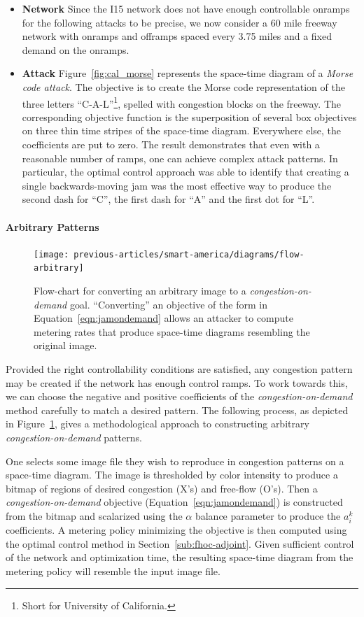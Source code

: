 \begin{itemize}
	\item \textbf{Network}
	Since the I15 network does not have enough controllable onramps for the following attacks to be precise, we now consider a 60 mile freeway network with onramps and offramps spaced every 3.75  miles and a fixed demand on the onramps.
	\item \textbf{Attack}
	Figure~\ref{fig:cal_morse} represents the space-time diagram of a \emph{Morse code attack}. The objective is to create the Morse code representation of the three letters ``C-A-L''\footnote{Short for University of California.}, spelled with congestion blocks on the freeway. The corresponding objective function is the superposition of several box objectives on three thin time stripes of the space-time diagram. Everywhere else, the coefficients are put to zero. The result demonstrates that even with a reasonable number of ramps, one can achieve complex attack patterns. In particular, the optimal control approach was able to identify that creating a single backwards-moving jam was the most effective way to produce the second dash for ``C'', the first dash for ``A'' and the first dot for ``L''.
\end{itemize}

\paragraph{Arbitrary Patterns}

\begin{figure}[htbp]
	\centering
	\texttt{[image: previous-articles/smart-america/diagrams/flow-arbitrary]}
	\caption{Flow-chart for converting an arbitrary image to a \emph{congestion-on-demand} goal. ``Converting'' an objective of the form in Equation~\ref{eqn:jamondemand} allows an attacker to compute metering rates that produce space-time diagrams resembling the original image.}
	\label{fig:flow-arbitrary}
\end{figure}

Provided the right controllability conditions are satisfied, any congestion pattern may be created if the network has enough control ramps. To work towards this, we can choose the negative and positive coefficients of the \emph{congestion-on-demand} method carefully to match a desired pattern. The following process, as depicted in Figure~\ref{fig:flow-arbitrary}, gives a methodological approach to constructing arbitrary \emph{congestion-on-demand} patterns.

One selects some image file they wish to reproduce in congestion patterns on a space-time diagram. The image is thresholded by color intensity to produce a bitmap of regions of desired congestion (X's) and free-flow (O's). Then a \emph{congestion-on-demand} objective (Equation~\eqref{eqn:jamondemand}) is constructed from the bitmap and scalarized using the $\alpha$ balance parameter to produce the $a_i^k$ coefficients. A metering policy minimizing the objective is then computed using the optimal control method in Section~\ref{sub:fhoc-adjoint}. Given sufficient control of the network and optimization time, the resulting space-time diagram from the metering policy will resemble the input image file.

